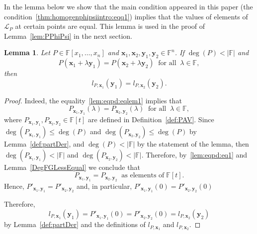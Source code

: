 \documentclass{elsarticle}
\def\F{{\mathbb F}}
\newtheorem{lemma}[theorem]{Lemma}
\theoremstyle{definition}
\numberwithin{equation}{section}
\begin{document}
In the lemma below we show that the main condition appeared in this paper (the condition~\eqref{thm:homogenphipsiintro:eqq1}) implies that the values of elements of $\mathcal L_P$ at certain points are equal. This lemma is used in the proof of Lemma~\ref{lem:PPhiPsi} in the next section.

\begin{lemma}\label{lem:eqpd}Let $P \in \F[x_1,\ldots, x_n]$ and  $\mathbf x_1, \mathbf x_2, \mathbf y_1, \mathbf y_2 \in \F^n$. If $\deg(P) < |\F|$ and
\begin{equation}\label{lem:eqpd:eqlem1}
P(\mathbf x_1 + \lambda \mathbf y_1) = P(\mathbf x_2 + \lambda \mathbf y_2)\;\;\mbox{for all}\;\;\lambda \in \F, 
\end{equation}
then
\begin{equation*}\label{lem:eqpd:eqlem2}
l_{P,\mathbf x_1}(\mathbf y_1) = l_{P, \mathbf x_2}(\mathbf y_2).
\end{equation*}
\end{lemma}
\begin{proof}Indeed, the equality~\eqref{lem:eqpd:eqlem1} implies that 
\begin{equation}\label{lem:eqpd:eq1}
P_{\mathbf x_1, \mathbf y_1}(\lambda) = P_{\mathbf x_2, \mathbf y_2}(\lambda)\;\;\mbox{for all}\;\;\lambda \in \F,
\end{equation}
where $P_{\mathbf x_1, \mathbf y_1}, P_{\mathbf x_2, \mathbf y_2} \in \F[t]$ are defined in Definition~\ref{def:PAV}. Since $\deg(P_{\mathbf x_1, \mathbf y_1}) \leq \deg(P)$ and $\deg(P_{\mathbf x_2, \mathbf y_2}) \leq \deg(P)$ by Lemma~\ref{def:partDer}, and $\deg(P) < |\F|$ by the statement of the lemma, then $\deg(P_{\mathbf x_1, \mathbf y_1}) < |\F|$ and $\deg(P_{\mathbf x_2, \mathbf y_2}) < |\F|$. Therefore, by~\eqref{lem:eqpd:eq1} and Lemma~\ref{DegFGLessEqual} we conclude that
\begin{equation}\label{lem:eqpd:eq2}
P_{\mathbf x_1, \mathbf y_1} = P_{\mathbf x_2, \mathbf y_2}\;\;\mbox{as elements of}\;\F[t].
\end{equation}
Hence, $P'_{\mathbf x_1, \mathbf y_1} = P'_{\mathbf x_2, \mathbf y_2}$ and, in particular,
$P'_{\mathbf x_1, \mathbf y_1}(0) = P'_{\mathbf x_2, \mathbf y_2}(0)$

Therefore,
\[
l_{P,\mathbf x_1}(\mathbf y_1) = P'_{\mathbf x_1, \mathbf y_1}(0) = P'_{\mathbf x_2, \mathbf y_2}(0) =  l_{P, \mathbf x_2}(\mathbf y_2)
\]
by Lemma~\ref{def:partDer} and the definitions of $l_{P,\mathbf x_1}$ and $l_{P,\mathbf x_2}$.
\end{proof}
\end{document}
